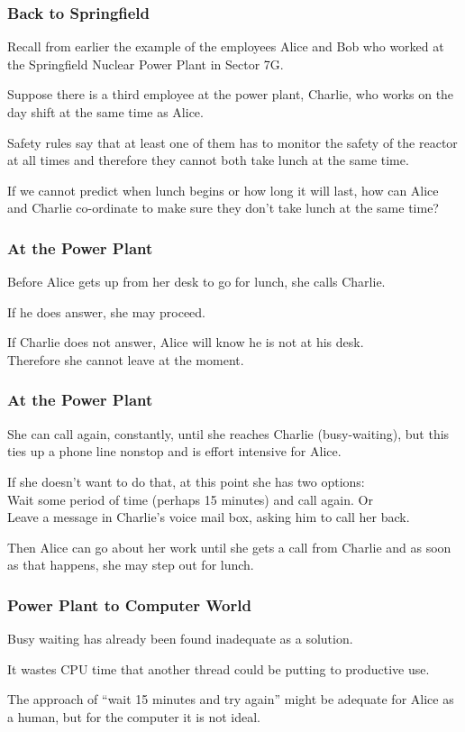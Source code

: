 \begin{frame}
	\frametitle{Back to Springfield}
	Recall from earlier the example of the employees Alice and Bob who worked at the Springfield Nuclear Power Plant in Sector 7G.

	Suppose there is a third employee at the power plant, Charlie, who works on the day shift at the same time as Alice.

	Safety rules say that at least one of them has to monitor the safety of the reactor at all times and therefore they cannot both take lunch at the same time.

	If we cannot predict when lunch begins or how long it will last, how can Alice and Charlie co-ordinate to make sure they don't take lunch at the same time?

\end{frame}

\begin{frame}
	\frametitle{At the Power Plant}

	Before Alice gets up from her desk to go for lunch, she calls Charlie.

	If he does answer, she may proceed.

	If Charlie does not answer, Alice will know he is not at his desk.\\
	\quad Therefore she cannot leave at the moment.

\end{frame}

\begin{frame}
	\frametitle{At the Power Plant}
	She can call again, constantly, until she reaches Charlie (busy-waiting), but this ties up a phone line nonstop and is effort intensive for Alice.

	If she doesn't want to do that, at this point she has two options:\\
	\quad Wait some period of time (perhaps 15 minutes) and call again. Or\\
	\quad Leave a message in Charlie's voice mail box, asking him to call her back.

	Then Alice can go about her work until she gets a call from Charlie and as soon as that happens, she may step out for lunch.


\end{frame}

\begin{frame}
	\frametitle{Power Plant to Computer World}

	Busy waiting has already been found inadequate as a solution.

	It wastes CPU time that another thread could be putting to productive use.

	The approach of ``wait 15 minutes and try again'' might be adequate for Alice as a human, but for the computer it is not ideal.
	
\end{frame}

